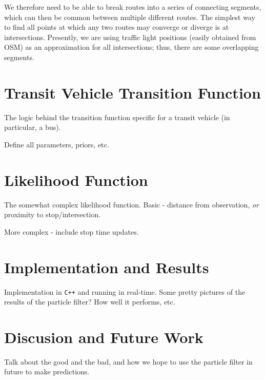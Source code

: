 \documentclass{IEEEtran}
\begin{document}
We therefore need to be able to break routes into a series
of connecting segments, 
which can then be common between multiple different routes.
The simplest way to find all points at which any two routes 
may converge or diverge is at intersections.
Presently, we are using traffic light positions 
(easily obtained from OSM)
as an approximation for all intersections;
thus, there are some overlapping segments.



\section{Transit Vehicle Transition Function}
\label{sec:transition}

The logic behind the transition function specific for a transit vehicle
(in particular, a bus).

Define all parameters, priors, etc.



\section{Likelihood Function}
\label{sec:likelihood}

The somewhat complex likelihood function.
Basic - distance from observation, \emph{or} proximity to stop/intersection.

More complex - include stop time updates.



\section{Implementation and Results}
\label{sec:results}

Implementation in \texttt{C++} and running in real-time.
Some pretty pictures of the results of the particle filter? 
How well it performs, etc.



\section{Discusion and Future Work}
\label{sec:discussion}

Talk about the good and the bad, and how we hope to use the particle filter in future to make predictions.
\end{document}
